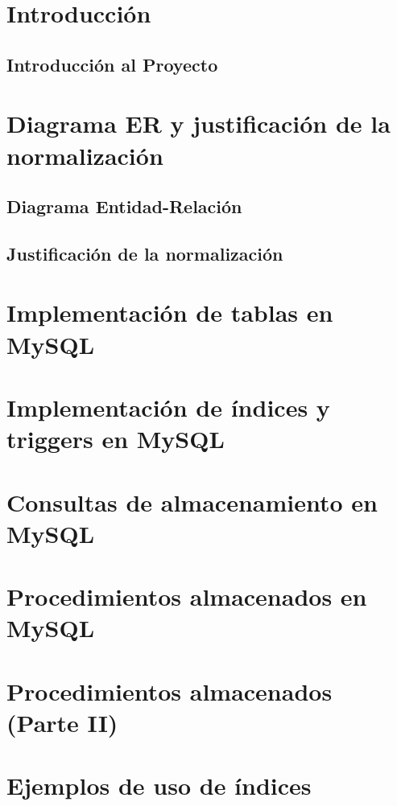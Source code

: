 \documentclass[12pt]{article}
\begin{document}


\tableofcontents
\newpage

\section{Introducción}
\subsection{Introducción al Proyecto}


\section{Diagrama ER y justificación de la normalización}
\subsection{Diagrama Entidad-Relación}


\subsection{Justificación de la normalización}


\section{Implementación de tablas en MySQL}



\section{Implementación de índices y triggers en MySQL}


\section{Consultas de almacenamiento en MySQL}


\section{Procedimientos almacenados en MySQL}

\section{Procedimientos almacenados (Parte II)}

\section{Ejemplos de uso de índices}

\end{document}
